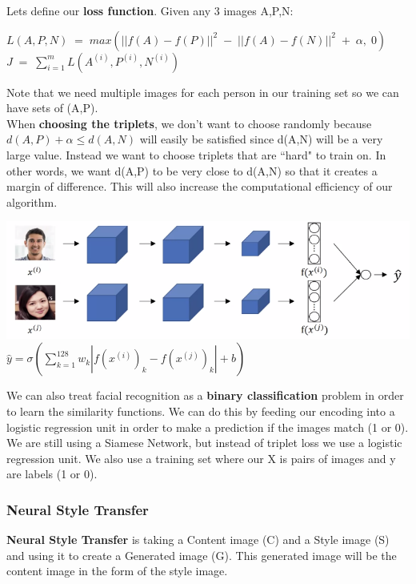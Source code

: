 \documentclass[11pt, a4paper]{article}
\begin{document}
\begin{spacing}{1.1}
	\noindent Lets define our \textbf{loss function}. Given any 3 images A,P,N:
	\begin{center}
	$L(A,P,N) \; = \; max(||f(A) - f(P)||^2 \; - \; ||f(A) - f(N)||^2 \; + \; \alpha, \; 0)$ \vspace*{1mm} \\
	$J \; = \; \sum_{i=1}^{m} L(A^{(i)}, P^{(i)}, N^{(i)})$
	\end{center}
	Note that we need multiple images for each person in our training set so we can have sets of (A,P). \vspace*{2mm}\\
	When \textbf{choosing the triplets}, we don't want to choose randomly because $d(A,P) + \alpha \leq d(A,N)$ will easily be satisfied since d(A,N) will be a very large value. Instead we want to choose triplets that are ``hard" to train on. In other words, we want d(A,P) to be very close to d(A,N) so that it creates a margin of difference. This will also increase the computational efficiency of our algorithm. \\
	\begin{center}
	\includegraphics[scale=.6]{bin_face} \\
	$\hat{y} = \sigma (\sum_{k=1}^{128} w_k |f(x^{(i)})_k - f(x^{(j)})_k| + b)$
	\end{center}
	We can also treat facial recognition as a \textbf{binary classification} problem in order to learn the similarity functions. We can do this by feeding our encoding into a logistic regression unit in order to make a prediction if the images match (1 or 0). We are still using a Siamese Network, but instead of triplet loss we use a logistic regression unit. We also use a training set where our X is pairs of images and y are labels (1 or 0). \\
	
	\subsubsection{Neural Style Transfer}
	\textbf{Neural Style Transfer} is taking a Content image (C) and a Style image (S) and using it to create a Generated image (G). This generated image will be the content image in the form of the style image. 
	
	
	
	
	
	
	
	
	
	
	
	
	
	
	
	
	
	
	
	
	
	
	
	
\end{spacing}
\end{document}
